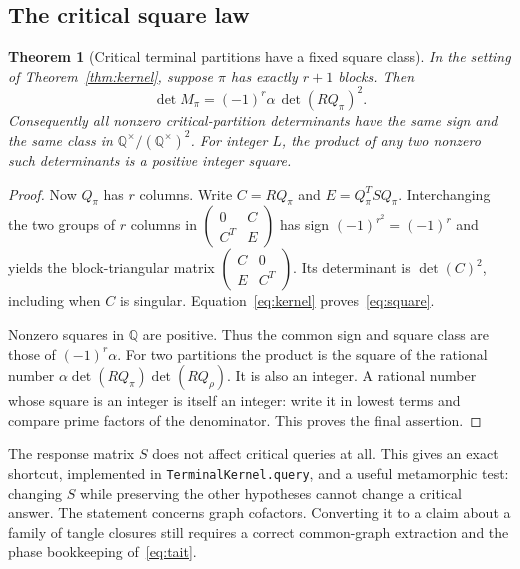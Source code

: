 \documentclass[11pt]{article}
\newtheorem{theorem}{Theorem}[section]
\theoremstyle{definition}
\theoremstyle{remark}
\newcommand{\Q}{\mathbb Q}
\newcommand{\code}[1]{\texttt{#1}}
\begin{document}
\subsection{The critical square law}
\begin{theorem}[Critical terminal partitions have a fixed square class]
\label{thm:square}
In the setting of Theorem~\ref{thm:kernel}, suppose $\pi$ has exactly $r+1$
blocks. Then
\begin{equation}\label{eq:square}
 \det M_\pi=(-1)^r\alpha\,\det(RQ_\pi)^2.
\end{equation}
Consequently all nonzero critical-partition determinants have the same sign
and the same class in $\Q^\times/(\Q^\times)^2$. For integer $L$, the product
of any two nonzero such determinants is a positive integer square.
\end{theorem}
\begin{proof}
Now $Q_\pi$ has $r$ columns. Write $C=RQ_\pi$ and $E=Q_\pi^TSQ_\pi$.
Interchanging the two groups of $r$ columns in
$\left(\begin{smallmatrix}0&C\\C^T&E\end{smallmatrix}\right)$ has sign
$(-1)^{r^2}=(-1)^r$ and yields the block-triangular matrix
$\left(\begin{smallmatrix}C&0\\E&C^T\end{smallmatrix}\right)$.
Its determinant is $\det(C)^2$, including when $C$ is singular.
Equation~\eqref{eq:kernel} proves~\eqref{eq:square}.

Nonzero squares in $\Q$ are positive. Thus the common sign and square class
are those of $(-1)^r\alpha$. For two partitions the product is the square
of the rational number $\alpha\det(RQ_\pi)\det(RQ_\rho)$. It is also an
integer. A rational number whose square is an integer is itself an integer:
write it in lowest terms and compare prime factors of the denominator.
This proves the final assertion.
\end{proof}

The response matrix $S$ does not affect critical queries at all. This gives
an exact shortcut, implemented in \code{TerminalKernel.query}, and a useful
metamorphic test: changing $S$ while preserving the other hypotheses cannot
change a critical answer. The statement concerns graph cofactors. Converting
it to a claim about a family of tangle closures still requires a correct
common-graph extraction and the phase bookkeeping of~\eqref{eq:tait}.
\end{document}
